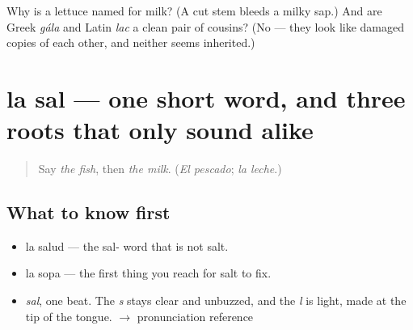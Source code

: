 \begin{tcolorbox}[breakable,colback=teal!4,colframe=teal!35!black,title={Before you move on}]
Why is a lettuce named for milk? (A cut stem bleeds a milky sap.) And are Greek \emph{gála} and Latin \emph{lac} a clean pair of cousins? (No — they look like damaged copies of each other, and neither seems inherited.)
\end{tcolorbox}
\section[la sal]{la sal — one short word, and three roots that only sound alike}

\label{lesson:ES-C361-sal}



\begin{quote}
Say \emph{the fish}, then \emph{the milk}. (\emph{El pescado}; \emph{la leche}.)
\end{quote}

\subsection*{What to know first}
\begin{itemize}
\raggedright
  \item la salud — the sal- word that is not salt.
  \item la sopa — the first thing you reach for salt to fix.
\end{itemize}

\begin{sounds}
\begin{itemize}
\raggedright
  \item \emph{sal}, one beat. The \emph{s} stays clear and unbuzzed, and the \emph{l} is light, made at the tip of the tongue. $\to$ pronunciation reference
\end{itemize}
\end{sounds}

